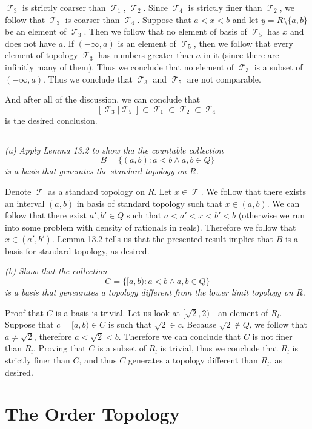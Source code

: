 \documentclass[11pt,oneside,titlepage]{book}
\DeclareMathOperator \topol {\mathcal {T}}
\newcommand{\set}[1]{\{ #1 \}}
\begin{document}
$\topol_3$ is strictly coarser than $\topol_1$, $\topol_2$. Since $\topol_4$
is strictly finer than $\topol_2$, we follow that $\topol_3$ is coarser than $\topol_4$.
Suppose that $a < x < b$ and let $y = R \setminus \set{a, b}$ be an element of $\topol_3$.
Then we follow that no element of basis of $\topol_5$ has $x$ and does not have $a$.
If $(-\infty, a)$ is an element of $\topol_5$, then we follow that every element of topology
$\topol_3$ has numbers greater than $a$ in it (since there are infinitly  many of them).
Thus we conclude that no element of $\topol_3$ is a subset of $(-\infty, a)$. Thus we
conclude that $\topol_3$ and $\topol_5$ are not comparable.

And after all of the discussion, we can conclude that
$$[\topol_3 | \topol_5] \subset \topol_1 \subset \topol_2 \subset \topol_4$$
is the desired conclusion.

\subsection{}

\textit{(a) Apply Lemma 13.2 to show tha the countable collection
  $$B = \set{(a, b): a < b \land a, b \in Q}$$
  is a basis that generates the standard topology on $R$.}

Denote $\topol$ as a standard topology on $R$. Let $x \in \topol$. We follow that
there exists an interval $(a, b)$ in basis of standard topology such that
$x \in (a, b)$. We can follow that there exist $a', b' \in Q$ such that
$a < a' < x < b' < b$ (otherwise we run into some problem with density of rationals
in reals). Therefore we follow that $x \in (a', b')$. Lemma 13.2 tells us that
the presented result implies that $B$ is a basis for standard topology, as desired.

\textit{(b) Show that the collection
  $$C = \set{[a, b): a < b \land a, b \in Q}$$
  is a basis that genenrates a topology different from the lower limit topology on $R$.}

Proof that $C$ is a basis is trivial.
Let us look at $[\sqrt{2}, 2)$ - an element of $R_l$. Suppose that $c = [a, b) \in C$ is
such that $\sqrt{2} \in c$. Because $\sqrt{2} \notin Q$, we follow that
$a \neq \sqrt{2}$, therefore $a < \sqrt{2} < b$. Therefore we can conclude that $C$ is
not finer than $R_l$. Proving that $C$ is a subset of $R_l$ is trivial, thus
we conclude that $R_l$ is strictly finer than $C$, and thus $C$ generates a topology
different than $R_l$, as desired.

\section{The Order Topology}
\end{document}
